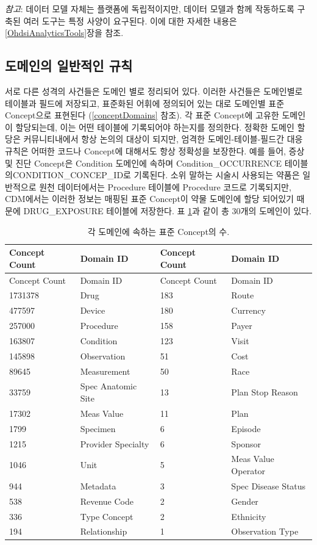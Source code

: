 \documentclass[11pt]{book}
\theoremstyle{definition}
\theoremstyle{definition}
\theoremstyle{definition}
\theoremstyle{remark}
\begin{document}
\emph{참고}: 데이터 모델 자체는 플랫폼에 독립적이지만, 데이터 모델과
함께 작동하도록 구축된 여러 도구는 특정 사양이 요구된다. 이에 대한
자세한 내용은 \ref{OhdsiAnalyticsTools}장을 참조.

\subsection{도메인의 일반적인 규칙}\label{domains}

서로 다른 성격의 사건들은 도메인 별로 정리되어 있다. 이러한 사건들은
도메인별로 테이블과 필드에 저장되고, 표준화된 어휘에 정의되어 있는 대로
도메인별 표준 Concept으로 표현된다 (\ref{conceptDomains} 참조). 각 표준
Concept에 고유한 도메인이 할당되는데, 이는 어떤 테이블에 기록되어야
하는지를 정의한다. 정확한 도메인 할당은 커뮤니티내에서 항상 논의의
대상이 되지만, 엄격한 도메인-테이블-필드간 대응 규칙은 어떠한 코드나
Concept에 대해서도 항상 정확성을 보장한다. 예를 들어, 증상 및 진단
Concept은 Condition 도메인에 속하며 Condition\_OCCURRENCE
테이블의CONDITION\_CONCEP\_ID로 기록된다. 소위 말하는 시술시 사용되는
약품은 일반적으로 원천 데이터에서는 Procedure 테이블에 Procedure 코드로
기록되지만, CDM에서는 이러한 정보는 매핑된 표준 Concept이 약물 도메인에
할당 되어있기 때문에 DRUG\_EXPOSURE 테이블에 저장한다. 표
\ref{tab:domains}과 같이 총 30개의 도메인이 있다.

\begin{longtable}[]{@{}llll@{}}
\caption{\label{tab:domains} 각 도메인에 속하는 표준 Concept의
수.}\tabularnewline
\toprule
Concept Count & Domain ID & Concept Count & Domain ID\tabularnewline
\midrule
\endfirsthead
\toprule
Concept Count & Domain ID & Concept Count & Domain ID\tabularnewline
\midrule
\endhead
1731378 & Drug & 183 & Route\tabularnewline
477597 & Device & 180 & Currency\tabularnewline
257000 & Procedure & 158 & Payer\tabularnewline
163807 & Condition & 123 & Visit\tabularnewline
145898 & Observation & 51 & Cost\tabularnewline
89645 & Measurement & 50 & Race\tabularnewline
33759 & Spec Anatomic Site & 13 & Plan Stop Reason\tabularnewline
17302 & Meas Value & 11 & Plan\tabularnewline
1799 & Specimen & 6 & Episode\tabularnewline
1215 & Provider Specialty & 6 & Sponsor\tabularnewline
1046 & Unit & 5 & Meas Value Operator\tabularnewline
944 & Metadata & 3 & Spec Disease Status\tabularnewline
538 & Revenue Code & 2 & Gender\tabularnewline
336 & Type Concept & 2 & Ethnicity\tabularnewline
194 & Relationship & 1 & Observation Type\tabularnewline
\bottomrule
\end{longtable}
\end{document}
